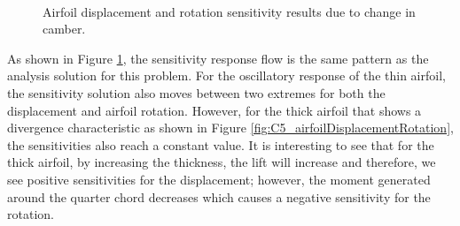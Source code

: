\begin{figure}[H]
    \centering
    \quad
    \\
    \quad
    \caption{Airfoil displacement and rotation sensitivity results due to change in camber.}
    \label{fig:C5_airfoilSensitivityTimeHistory}
\end{figure}
%
As shown in Figure \ref{fig:C5_airfoilSensitivityTimeHistory}, the sensitivity response flow is the same pattern as the analysis solution for this problem. For the oscillatory response of the thin airfoil, the sensitivity solution also moves between two extremes for both the displacement and airfoil rotation. However, for the thick airfoil that shows a divergence characteristic as shown in Figure \ref{fig:C5_airfoilDisplacementRotation}, the sensitivities also reach a constant value. It is interesting to see that for the thick airfoil, by increasing the thickness, the lift will increase and therefore, we see positive sensitivities for the displacement; however, the moment generated around the quarter chord decreases which causes a negative sensitivity for the rotation.


